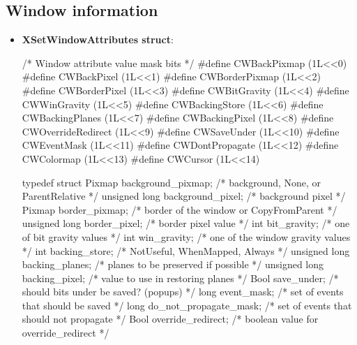 \documentclass{report}
\begin{document}
    \subsection{Window information}
    \begin{itemize}
        \item \textbf{XSetWindowAttributes struct}:
            \bigbreak \noindent 
            \begin{cppcode}
                /* Window attribute value mask bits */
                #define CWBackPixmap        (1L<<0)
                #define CWBackPixel         (1L<<1)
                #define CWBorderPixmap      (1L<<2)
                #define CWBorderPixel       (1L<<3)
                #define CWBitGravity        (1L<<4)
                #define CWWinGravity        (1L<<5)
                #define CWBackingStore      (1L<<6)
                #define CWBackingPlanes     (1L<<7)
                #define CWBackingPixel      (1L<<8)
                #define CWOverrideRedirect  (1L<<9)
                #define CWSaveUnder         (1L<<10)
                #define CWEventMask         (1L<<11)
                #define CWDontPropagate     (1L<<12)
                #define CWColormap          (1L<<13)
                #define CWCursor            (1L<<14)
            \end{cppcode}
            \begin{cppcode}
                typedef struct {
                    Pixmap background_pixmap;       /* background, None, or ParentRelative */
                    unsigned long background_pixel; /* background pixel */
                    Pixmap border_pixmap;           /* border of the window or CopyFromParent */
                    unsigned long border_pixel;     /* border pixel value */
                    int bit_gravity;                /* one of bit gravity values */
                    int win_gravity;                /* one of the window gravity values */
                    int backing_store;              /* NotUseful, WhenMapped, Always */
                    unsigned long backing_planes;   /* planes to be preserved if possible */
                    unsigned long backing_pixel;    /* value to use in restoring planes */
                    Bool save_under;                /* should bits under be saved? (popups) */
                    long event_mask;                /* set of events that should be saved */
                    long do_not_propagate_mask;     /* set of events that should not propagate */
                    Bool override_redirect;         /* boolean value for override_redirect */
}
\end{cppcode}
\end{itemize}
\end{document}
